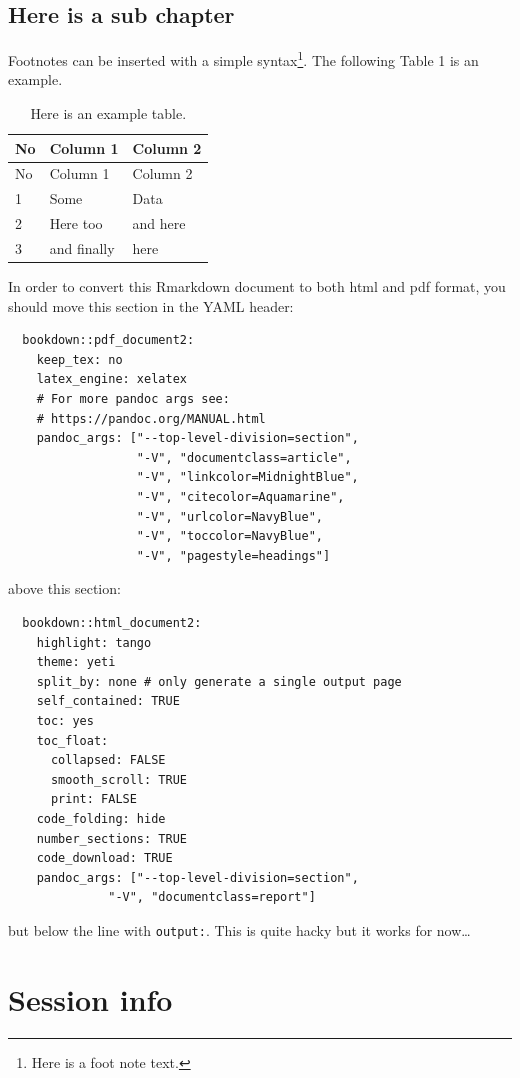 \documentclass[
]{article}
\let\rmarkdownfootnote\footnote%
\def\footnote{\protect\rmarkdownfootnote}
\begin{document}
\hypertarget{here-is-a-sub-chapter}{%
\subsection{Here is a sub chapter}\label{here-is-a-sub-chapter}}

Footnotes can be inserted with a simple syntax\footnote{Here is a foot note text.}. The following Table 1 is an example.

\begin{longtable}[]{@{}lll@{}}
\caption{Here is an example table.}\tabularnewline
\toprule
No & Column 1 & Column 2\tabularnewline
\midrule
\endfirsthead
\toprule
No & Column 1 & Column 2\tabularnewline
\midrule
\endhead
1 & Some & Data\tabularnewline
2 & Here too & and here\tabularnewline
3 & and finally & here\tabularnewline
\bottomrule
\end{longtable}

In order to convert this Rmarkdown document to both html and pdf format, you should move this section in the YAML header:

\begin{verbatim}
  bookdown::pdf_document2:
    keep_tex: no
    latex_engine: xelatex
    # For more pandoc args see:
    # https://pandoc.org/MANUAL.html
    pandoc_args: ["--top-level-division=section",
                  "-V", "documentclass=article",
                  "-V", "linkcolor=MidnightBlue",
                  "-V", "citecolor=Aquamarine",
                  "-V", "urlcolor=NavyBlue",
                  "-V", "toccolor=NavyBlue",
                  "-V", "pagestyle=headings"]
\end{verbatim}

above this section:

\begin{verbatim}
  bookdown::html_document2:
    highlight: tango
    theme: yeti
    split_by: none # only generate a single output page
    self_contained: TRUE
    toc: yes
    toc_float: 
      collapsed: FALSE
      smooth_scroll: TRUE
      print: FALSE
    code_folding: hide
    number_sections: TRUE
    code_download: TRUE
    pandoc_args: ["--top-level-division=section",
              "-V", "documentclass=report"]
\end{verbatim}

but below the line with \texttt{output:}. This is quite hacky but it works for now\ldots{}

\clearpage

\hypertarget{session-info}{%
\section{Session info}\label{session-info}}
\end{document}
